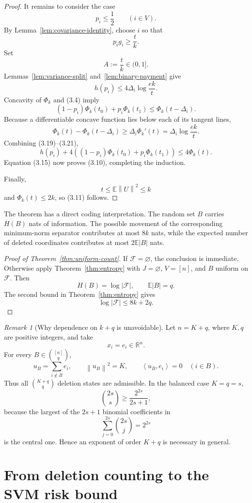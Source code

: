 \documentclass[11pt]{article}
\theoremstyle{definition}
\theoremstyle{remark}
\newtheorem{remark}[theorem]{Remark}
\newcommand{\E}{\mathbb E}
\newcommand{\ip}[2]{\left\langle #1,#2\right\rangle}
\newcommand{\norm}[1]{\left\lVert #1\right\rVert}
\begin{document}
\begin{proof}
It remains to consider the case
\[
 p_i\le\frac12\qquad(i\in V).
 \tag{3.18}
\]
By Lemma~\ref{lem:covariance-identity}, choose \(i\) so that
\[
 p_i g_i\ge\frac tk.
\]
Set
\[
 A:=\frac tk\in(0,1].
\]
Lemmas~\ref{lem:variance-split} and~\ref{lem:binary-payment} give
\[
 h(p_i)
 \le
 4\Delta_i\log\frac{ek}{t}.
 \tag{3.19}
\]
Concavity of \(\Phi_k\) and (3.4) imply
\[
 (1-p_i)\Phi_k(t_0)+p_i\Phi_k(t_1)
 \le
 \Phi_k(t-\Delta_i).
 \tag{3.20}
\]
Because a differentiable concave function lies below each of its tangent
lines,
\[
 \Phi_k(t)-\Phi_k(t-\Delta_i)
 \ge
 \Delta_i\Phi_k'(t)
 =
 \Delta_i\log\frac{ek}{t}.
 \tag{3.21}
\]
Combining (3.19)--(3.21),
\[
 h(p_i)
 +4\left(
      (1-p_i)\Phi_k(t_0)
      +p_i\Phi_k(t_1)
   \right)
 \le
 4\Phi_k(t).
\]
Equation (3.15) now proves (3.10), completing the induction.

Finally,
\[
 t\le\E\norm U^2\le k
\]
and \(\Phi_k(t)\le2k\), so (3.11) follows.
\end{proof}

The theorem has a direct coding interpretation. The random set \(B\) carries
\(H(B)\) nats of information. The possible movement of the corresponding
minimum-norm separator contributes at most \(8k\) nats, while the expected
number of deleted coordinates contributes at most \(2\E|B|\) nats.

\begin{proof}[Proof of Theorem~\ref{thm:uniform-count}]
If \(\mathcal F=\varnothing\), the conclusion is immediate. Otherwise apply
Theorem~\ref{thm:entropy} with \(J=\varnothing\), \(V=[n]\), and \(B\) uniform
on \(\mathcal F\). Then
\[
 H(B)=\log|\mathcal F|,
 \qquad
 \E|B|=q.
\]
The second bound in Theorem~\ref{thm:entropy} gives
\[
 \log|\mathcal F|\le8k+2q.
\]
\end{proof}

\begin{remark}[Why dependence on \(k+q\) is unavoidable]
Let \(n=K+q\), where \(K,q\) are positive integers, and take
\[
 x_i=e_i\in\mathbb R^n.
\]
For every \(B\in\binom{[n]}q\),
\[
 u_B=\sum_{i\notin B}e_i,
 \qquad
 \norm{u_B}^2=K,
 \qquad
 \ip{u_B}{e_i}=0\quad(i\in B).
\]
Thus all \(\binom{K+q}{q}\) deletion states are admissible. In the balanced
case \(K=q=s\),
\[
 \binom{2s}{s}\ge\frac{2^{2s}}{2s+1},
\]
because the largest of the \(2s+1\) binomial coefficients in
\[
 \sum_{j=0}^{2s}\binom{2s}{j}=2^{2s}
\]
is the central one. Hence an exponent of order \(K+q\) is necessary in
general.
\end{remark}

\section{From deletion counting to the SVM risk bound}
\label{sec:statistical-reduction}
\end{document}

